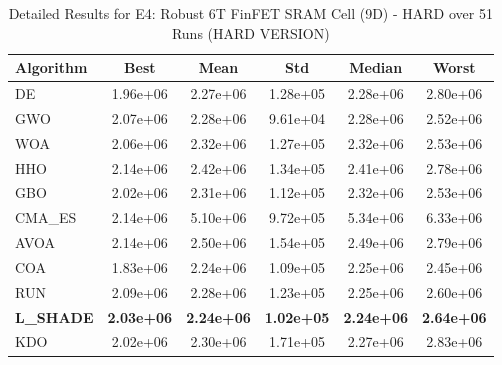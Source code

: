 \begin{table}[htbp]
\centering
\caption{Detailed Results for E4: Robust 6T FinFET SRAM Cell (9D) - HARD over 51 Runs (HARD VERSION)}
\label{tab:P4_detailed}
\small
\begin{tabular}{lccccc}
\toprule
\textbf{Algorithm} & \textbf{Best} & \textbf{Mean} & \textbf{Std} & \textbf{Median} & \textbf{Worst} \\
\midrule
DE & 1.96e+06 & 2.27e+06 & 1.28e+05 & 2.28e+06 & 2.80e+06 \\
GWO & 2.07e+06 & 2.28e+06 & 9.61e+04 & 2.28e+06 & 2.52e+06 \\
WOA & 2.06e+06 & 2.32e+06 & 1.27e+05 & 2.32e+06 & 2.53e+06 \\
HHO & 2.14e+06 & 2.42e+06 & 1.34e+05 & 2.41e+06 & 2.78e+06 \\
GBO & 2.02e+06 & 2.31e+06 & 1.12e+05 & 2.32e+06 & 2.53e+06 \\
CMA_ES & 2.14e+06 & 5.10e+06 & 9.72e+05 & 5.34e+06 & 6.33e+06 \\
AVOA & 2.14e+06 & 2.50e+06 & 1.54e+05 & 2.49e+06 & 2.79e+06 \\
COA & 1.83e+06 & 2.24e+06 & 1.09e+05 & 2.25e+06 & 2.45e+06 \\
RUN & 2.09e+06 & 2.28e+06 & 1.23e+05 & 2.25e+06 & 2.60e+06 \\
\textbf{L_SHADE} & \textbf{2.03e+06} & \textbf{2.24e+06} & \textbf{1.02e+05} & \textbf{2.24e+06} & \textbf{2.64e+06} \\
KDO & 2.02e+06 & 2.30e+06 & 1.71e+05 & 2.27e+06 & 2.83e+06 \\
\bottomrule
\end{tabular}
\end{table}
